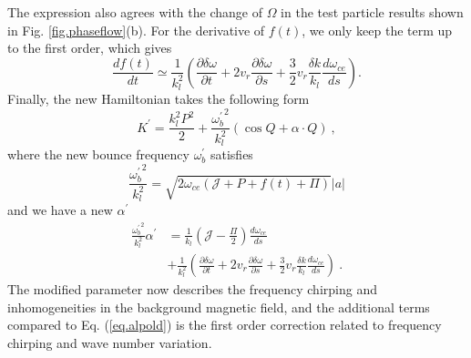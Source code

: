 The expression also agrees with the change of $\Omega$ in the test particle results shown in Fig. \ref{fig.phaseflow}(b).
For the derivative of $f(t)$, we only keep the term up to the first order, which gives
\begin{equation}
    \frac{d f(t)}{d t} \simeq \frac{1}{k_l^2}(\frac{\partial \delta \omega}{\partial t} + 2 v_r \frac{\partial \delta \omega}{\partial s} + \frac{3}{2}v_r\frac{\delta k}{k_l} \frac{d \omega_{ce}}{d s}  ).
\end{equation}
Finally, the new Hamiltonian takes the following form 
\begin{equation}\label{eq.H_frame}
    K^\prime = \frac{k_l^2 P^2}{2} + \frac{{\omega^\prime_{b}}^2}{k_l^2} (\cos Q + \alpha \cdot Q)~,
\end{equation}
where the new bounce frequency $\omega^\prime_{b}$ satisfies
\begin{equation}
    \frac{{\omega^\prime_{b}}^2}{k_l^2} = \sqrt{2\omega_{ce}(\mathcal{J}+P+f(t)+\Pi)}  |a|
\end{equation}
and we have a new $\alpha^\prime$
\begin{equation}\label{eq.alpnew}
    \begin{aligned}
    \frac{{\omega^\prime_{b}}^2}{k_l^2}\alpha^\prime & = \frac{1}{k_l}\left(\mathcal{J} - \frac{\Pi}{2}\right) \frac{d\omega_{ce}}{ds} \\
    & + \frac{1}{k_l^2}\left(\frac{\partial \delta \omega}{\partial t} + 2 v_r \frac{\partial \delta \omega}{\partial s} + \frac{3}{2}v_r\frac{\delta k}{k_l} \frac{d \omega_{ce}}{d s}\right)~.
    \end{aligned}
\end{equation}
The modified parameter now describes the frequency chirping and inhomogeneities in the background magnetic field, and 
the additional terms compared to Eq. (\ref{eq.alpold}) is the first order correction related to frequency chirping and wave number variation.

